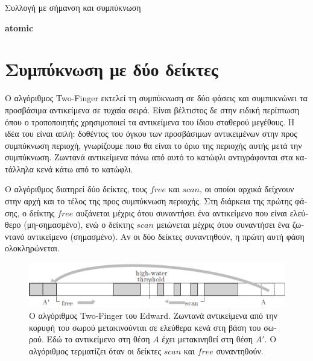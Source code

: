 \begin{greek}
\begin{algorithm}
  \caption{Συλλογή με σήμανση και συμπύκνωση}
  \label{alg:mrkcmp_1}
  \begin{algorithmic}[1]
      \State \textbf{atomic}
      \State {}
      \State {}
    \EndProcedure
  \end{algorithmic}
\end{algorithm}

\section{Συμπύκνωση με δύο δείκτες}
Ο αλγόριθμος Two-Finger \cite{saunders1964lisp} εκτελεί τη συμπύκνωση σε δύο φάσεις και 
συμπυκνώνει τα προσβάσιμα αντικείμενα σε τυχαία σειρά. Είναι βέλτιστος δε στην ειδική 
περίπτωση όπου ο τροποποιητής χρησιμοποιεί τα αντικείμενα του ίδιου σταθερού μεγέθους. 
Η ιδέα του είναι απλή: δοθέντος του όγκου των προσβάσιμων αντικειμένων στην προς συμπύκνωση 
περιοχή, γνωρίζουμε ποιο θα είναι το όριο της περιοχής αυτής μετά την συμπύκνωση. Ζωντανά 
αντικείμενα πάνω από αυτό το κατώφλι αντιγράφονται στα κατάλληλα κενά κάτω  από το κατώφλι.

Ο αλγόριθμος διατηρεί δύο δείκτες, τους $free$ και $scan$, οι οποίοι αρχικά δείχνουν στην 
αρχή και το τέλος της προς συμπύκνωση περιοχής. Στη διάρκεια της πρώτης φάσης, ο δείκτης 
$free$ αυξάνεται μέχρις ότου συναντήσει ένα αντικείμενο που είναι ελεύθερο (μη-σημασμένο), 
ενώ ο δείκτης $scan$ μειώνεται μέχρις ότου συναντήσει ένα ζωντανό αντικείμενο (σημασμένο). 
Αν οι δύο δείκτες συναντηθούν, η πρώτη αυτή φάση ολοκληρώνεται. 

\begin{figure}
  \centering
  \includegraphics{figures/mrkcmp_1}
  \caption[Ο αλγόριθμος Two-Finger του Edward]
    {Ο αλγόριθμος Two-Finger του Edward. Ζωντανά αντικείμενα
     από την κορυφή του σωρού μετακινούνται σε ελεύθερα κενά
     στη βάση του σωρού. Εδώ το αντικείμενο στη θέση $Α$ έχει
     μετακινηθεί στη θέση $Α'$. Ο αλγόριθμος τερματίζει όταν
     οι δείκτες $scan$ και $free$ συναντηθούν.}
  \label{fig:mrkcmp_1}
\end{figure}


\end{greek}
